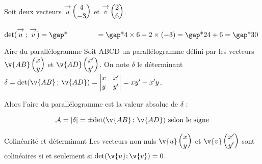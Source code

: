 \documentclass[10pt,a4paper,openany,twoside, prof]{book}
\begin{document}
\begin{ex}{}{}
	Soit deux vecteurs $\overrightarrow{\,\mathstrut u\,}\begin{pmatrix}4\\-3\end{pmatrix}$ et $\overrightarrow{\,\mathstrut v\,}\begin{pmatrix}2\\6\end{pmatrix}$.

	$\det{\vecu}{\vecv} = \troum{\quad\quad\quad\quad} = \troum{4\times 6-2\times(-3)} = \troum{24+6} = \troum{30}$
\end{ex}

\begin{propadmise}{Aire du parallélogramme}{}
	Soit ABCD un parallélogramme défini par les vecteurs $\v{AB}\coordvp{x}{y}$ et $\v{AD}\coordvp{x'}{y'}$. On note $\delta$ le déterminant $\delta = \det{\v{AB}}{\v{AD}} = \Det{x & x' \\ y & y'} = xy'-x'y$.

	\begin{minipage}{.6\textwidth}
\end{minipage}
\begin{minipage}{.4\textwidth}Alors l'aire du parallélogramme est la valeur absolue de $\delta$ :

	\medskip
			$$\mathcal{A} = |\delta| = \pm\det{\v{AB}}{\v{AD}} \text{ selon le signe}$$
\end{minipage}

\end{propadmise}

\begin{prop}{Colinéarité et déterminant}{}
	Les vecteurs non nuls $\v{u}\coordvp{x}{y}$ et $\v{v}\coordvp{x'}{y'}$ sont colinéaires si et seulement si $\text{det}(\v{u};\v{v})=0$.
\end{prop}
\end{document}

